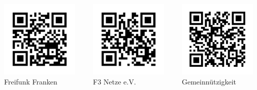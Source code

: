 \documentclass{beamer}
\begin{document}
	\begin{frame}[plain]
		\begin{columns}
		\begin{column}{0.3\textwidth}
		\includegraphics[width=10em]{media/freifunk-qr.png} \\
		Freifunk Franken

		\end{column}

		\begin{column}{0.3\textwidth}
		\includegraphics[width=10em]{media/f3netze-qr.png} \\
		F3 Netze e.V.

		\end{column}

		\begin{column}{0.3\textwidth}
		\includegraphics[width=10em]{media/gemeinnutz-qr.png} \\
		Gemeinnützigkeit

		\end{column}
		\end{columns}
	\end{frame}
\end{document}
